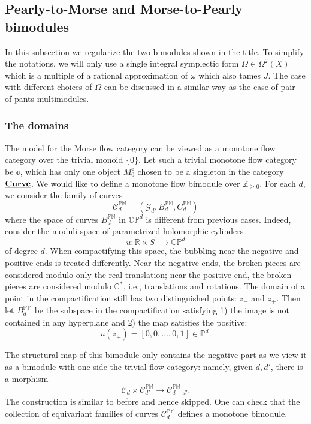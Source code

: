 \documentclass[reqno, 10pt]{amsart}
\numberwithin{equation}{section}
\numberwithin{equation}{section}
\theoremstyle{definition}
\theoremstyle{remark}
\newcommand{\beqn}{\begin{equation*}}
\newcommand{\eeqn}{\end{equation*}}
\newcommand{\mb}{\mathbb}
\newcommand{\mc}{\mathcal}
\newcommand{\uds}[1]{\underline{\smash{#1}}}
\begin{document}
\subsection{Pearly-to-Morse and Morse-to-Pearly bimodules}

In this subsection we regularize the two bimodules shown in the title. To simplify the notations, we will only use a single integral symplectic form $\Omega \in \Omega^2(X)$ which is a multiple of a rational approximation of $\omega$ which also tames $J$. The case with different choices of $\Omega$ can be discussed in a similar way as the case of pair-of-pants multimodules. 


\subsubsection{The domains}

The model for the Morse flow category can be viewed as a monotone flow category over the trivial monoid $\{0\}$. Let such a trivial monotone flow category be $\mb{o}$, which has only one object $M_0^{\mb{o}}$ chosen to be a singleton in the category $\uds{\bf Curve}$. We would like to define a monotone flow bimodule over ${\mb Z}_{\geq 0}$. For each $d$, we consider the family of curves
\beqn
{\mc C}_d^{\mb{PM}} = ({\mc G}_d, B_d^{\mb{PM}}, C_d^{\mb{PM}})
\eeqn
where the space of curves $B_d^{\mb{PM}}$ in $\mb{CP}^d$ is different from previous cases. Indeed, consider the moduli space of parametrized holomorphic cylinders
\beqn
u: {\mb R} \times S^1 \to \mb{CP}^d
\eeqn
of degree $d$. When compactifying this space, the bubbling near the negative and positive ends is treated differently. Near the negative ends, the broken pieces are considered modulo only the real translation; near the positive end, the broken pieces are considered modulo ${\mb C}^*$, i.e., translations and rotations. The domain of a point in the compactification still has two distinguished points: $z_-$ and $z_+$. Then let $B_d^{\mb{PM}}$ be the subspace in the compactification satisfying 1) the image is not contained in any hyperplane and 2) the map satisfies the positive:
\beqn
u(z_+) = [0, 0, \ldots, 0, 1] \in {\mb P}^d.
\eeqn

The structural map of this bimodule only contains the negative part as we view it as a bimodule with one side the trivial flow category: namely, given $d, d'$, there is a morphism
\beqn
{\mc C}_d \times {\mc C}_{d'}^{\mb{PM}} \to {\mc C}_{d+d'}^{\mb{PM}}.
\eeqn
The construction is similar to before and hence skipped. One can check that the collection of equivariant families of curves $\mc{C}_d^{\mb{PM}}$ defines a monotone bimodule.
\end{document}
